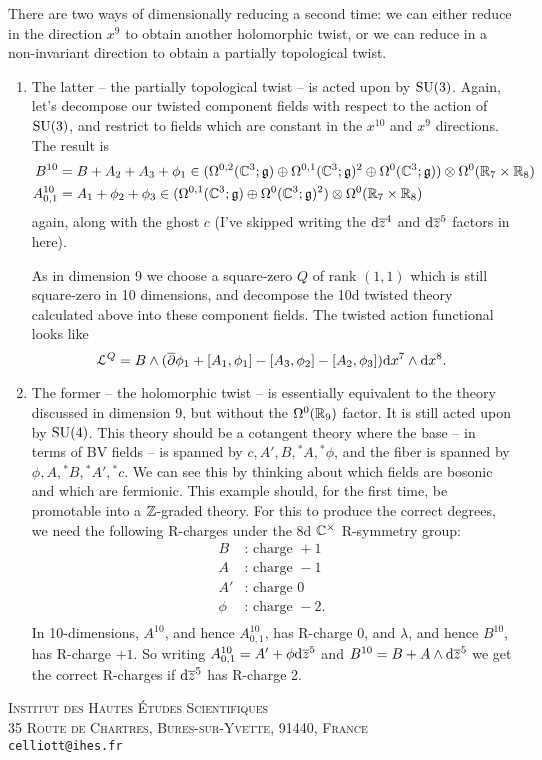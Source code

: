 \documentclass[10pt, oneside]{article}
\renewcommand{\d}{\mathrm{d}}
\newcommand{\st}[1]{{}^*{#1}}
\begin{document}
\begin{example}[8d $\mc N=1$ Super Yang-Mills]
There are two ways of dimensionally reducing a second time: we can either reduce in the direction $x^9$ to obtain another holomorphic twist, or we can reduce in a non-invariant direction to obtain a partially topological twist.  

\begin{enumerate}
\item The latter -- the partially topological twist -- is acted upon by $\mathrm{SU}(3)$.  Again, let's decompose our twisted component fields with respect to the action of $\mathrm{SU}(3)$, and restrict to fields which are constant in the $x^{10}$ and $x^9$ directions.  The result is
\begin{align*}
B^{10} &= B + A_2 + A_3 + \phi_1 \in (\Omega^{0,2}(\mathbb{C}^3; \mathfrak{g}) \oplus \Omega^{0,1}(\mathbb{C}^3; \mathfrak{g})^2\oplus \Omega^0(\mathbb{C}^3; \mathfrak{g})) \otimes \Omega^0(\mathbb{R}_7 \times \mathbb{R}_8)\\
A^{10}_{0,1} &= A_1 + \phi_2 + \phi_3 \in (\Omega^{0,1}(\mathbb{C}^3; \mathfrak{g}) \oplus \Omega^0(\mathbb{C}^3; \mathfrak{g})^2) \otimes \Omega^0(\mathbb{R}_7 \times \mathbb{R}_8)
\end{align*}
again, along with the ghost $c$ (I've skipped writing the $\d \ol z^4$ and $\d \ol z^5$ factors in here).

As in dimension 9 we choose a square-zero $Q$ of rank $(1,1)$ which is still square-zero in 10 dimensions, and decompose the 10d twisted theory calculated above into these component fields.  The twisted action functional looks like
\[\LL^Q = B \wedge (\ol \dd \phi_1 + [A_1,\phi_1] - [A_3,\phi_2] - [A_2,\phi_3]) \d x^7 \wedge \d x^8.\]

\item The former -- the holomorphic twist -- is essentially equivalent to the theory discussed in dimension 9, but without the $\Omega^0(\mathbb{R}_9)$ factor.  It is still acted upon by $\mathrm{SU}(4)$.  This theory should be a cotangent theory where the base -- in terms of BV fields -- is spanned by $c, A', B, \st A, \st \phi$, and the fiber is spanned by $\phi, A, \st B, \st A', \st c$.  We can see this by thinking about which fields are bosonic and which are fermionic.  This example should, for the first time, be promotable into a $\mathbb{Z}$-graded theory.  For this to produce the correct degrees, we need the following R-charges under the 8d $\mathbb{C}^\times$ R-symmetry group:
\begin{align*}
B &\text{: charge } +1 \\
A &\text{: charge } -1 \\
A' &\text{: charge } 0 \\
\phi &\text{: charge } -2. \\
\end{align*}
In 10-dimensions, $A^{10}$, and hence $A_{0,1}^{10}$, has R-charge 0, and $\lambda$, and hence $B^{10}$, has R-charge $+1$.  So writing $A_{0,1}^{10} = A' + \phi \d \ol z^5$ and $B^{10} = B + A \wedge \d \ol z^5$ we get the correct R-charges if $\d \ol z^5$ has R-charge 2.

\end{enumerate}

\end{example}




\pagestyle{bib}
\printbibliography

\textsc{Institut des Hautes \'Etudes Scientifiques}\\
\textsc{35 Route de Chartres, Bures-sur-Yvette, 91440, France}\\
\texttt{celliott@ihes.fr}
\end{document}
